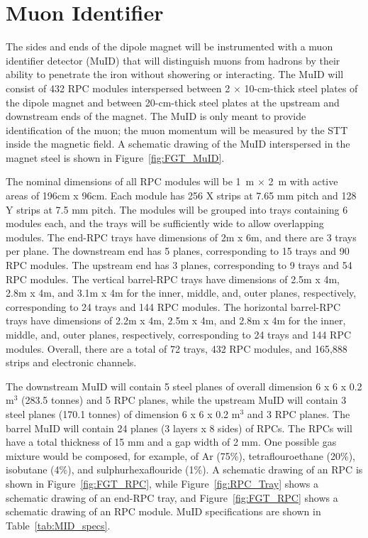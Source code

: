 \section{Muon Identifier}
\label{sec:nd-nnd-muid}

The sides and ends of the dipole magnet will be instrumented
with a muon identifier
detector (MuID) that will distinguish muons from hadrons by their ability 
to penetrate the iron without showering or interacting.
The MuID will consist of 432 RPC modules
interspersed between 2 $\times$ 10-cm-thick steel plates of the 
dipole magnet and between 20-cm-thick steel plates at the upstream and
downstream ends of the magnet. 
The MuID is only meant to provide %
identification of the 
muon; the muon momentum %
will be measured by the STT inside the 
magnetic field. A schematic drawing of the MuID 
interspersed in the magnet steel is shown in Figure~\ref{fig:FGT_MuID}.

The nominal dimensions of all RPC modules will be 1~m $\times$ 2~m with
active areas of 196cm x 96cm. Each
module has 256 X strips
at 7.65 mm pitch and 128 Y strips at 7.5 mm pitch. The modules
will be grouped into trays containing 6 modules each, and the trays will
be sufficiently wide to allow overlapping modules. 
The end-RPC trays have dimensions of 2m x 6m, and there are 3 trays per plane.
The downstream end has 5 planes, corresponding to 15 trays and 90 RPC modules.
The upstream end has 3 planes, corresponding to 9 trays and 54 RPC modules.
The vertical barrel-RPC trays have dimensions of 2.5m x 4m, 2.8m x 4m, and
3.1m x 4m for the inner, middle, and, outer planes, respectively, corresponding
to 24 trays and 144 RPC modules. The horizontal
barrel-RPC trays have dimensions of 2.2m x 4m, 2.5m x 4m, and
2.8m x 4m for the inner, middle, and, outer planes, respectively, 
corresponding to 24 trays and 144 RPC modules. Overall, there are a total of
72 trays, 432 RPC modules, and 165,888 strips and electronic channels. 

The downstream MuID will contain 5 steel planes of 
overall dimension
6 x 6 x 0.2 m$^3$ (283.5 tonnes)
and 5 RPC planes, while the upstream MuID will contain 3 steel
planes (170.1 tonnes) of dimension 6 x 6 x 0.2 m$^3$ and 3 RPC planes. The barrel MuID will contain
24 planes (3 layers x 8 sides) of RPCs. The RPCs will have a total thickness 
of 15 mm and a gap width of 2 mm. One possible gas mixture would be composed, for example,
of Ar (75\%), tetraflouroethane (20\%), isobutane (4\%),
and sulphurhexaflouride (1\%). 
A schematic drawing of an RPC is shown in Figure~\ref{fig:FGT_RPC}, while
Figure~\ref{fig:RPC_Tray} shows a schematic drawing of an end-RPC tray,
and Figure~\ref{fig:FGT_RPC} shows a schematic drawing of an RPC module.
MuID specifications are shown in Table~\ref{tab:MID_specs}.

